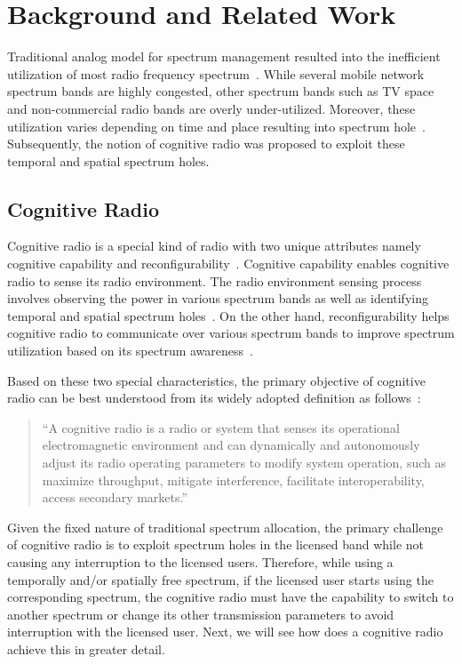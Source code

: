\chapter{Background and Related Work}\label{relatedWork}

Traditional analog model for spectrum management resulted into the inefficient utilization of most radio frequency spectrum~\cite{valenta2010survey}. While several mobile network spectrum bands are highly congested, other spectrum bands such as TV space and non-commercial radio bands are overly under-utilized. Moreover, these utilization varies depending on time and place resulting into spectrum hole~\cite{tandra2009spectrum}. Subsequently, the notion of cognitive radio was proposed to exploit these temporal and spatial spectrum holes.

\section{Cognitive Radio}
Cognitive radio is a special kind of radio with two unique attributes namely cognitive capability and reconfigurability~\cite{akyildiz2006next, thomas2005cognitive, haykin2005cognitive}. Cognitive capability enables cognitive radio to sense its radio environment. The radio environment sensing process involves observing the power in various spectrum bands as well as identifying temporal and spatial spectrum holes~\cite{akyildiz2006next}. On the other hand, reconfigurability helps cognitive radio to communicate over various spectrum bands to improve spectrum utilization based on its spectrum awareness~\cite{jondral2005software}.

Based on these two special characteristics, the primary objective of cognitive radio can be best understood from its widely adopted definition as follows~\cite{federal2005notice}:

\begin{quote}
``A cognitive radio is a radio or system that senses its operational electromagnetic environment and can dynamically and autonomously adjust its radio operating parameters to modify system operation, such as maximize throughput, mitigate interference, facilitate interoperability, access secondary markets.''
\end{quote}

Given the fixed nature of traditional spectrum allocation, the primary challenge of cognitive radio is to exploit spectrum holes in the licensed band while not causing any interruption to the licensed users. Therefore, while using a temporally and/or spatially free spectrum, if the licensed user starts using the corresponding spectrum, the cognitive radio must have the capability to switch to another spectrum or change its other transmission parameters to avoid interruption with the licensed user. Next, we will see how does a cognitive radio achieve this in greater detail.

